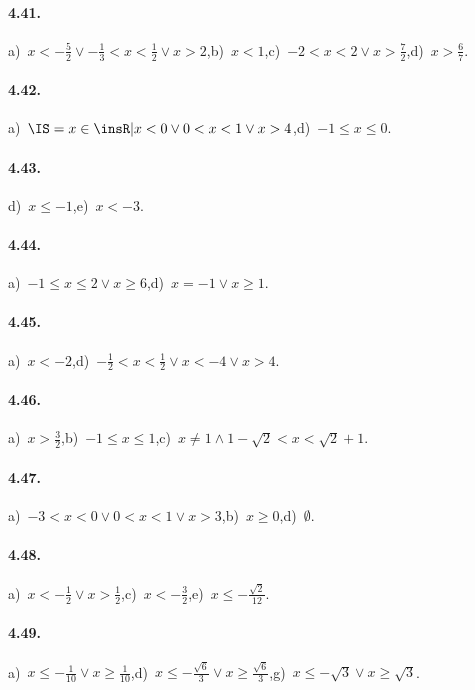 \paragraph{4.41.} a)~$x<-\frac 5 2\vee -\frac 1 3<x<\frac 1 2\vee x>2$,\quad b)~$x<1$,\quad c)~$-2<x<2\vee x>\frac 7 2$,\quad d)~$x>\frac{6}{7}$.

\paragraph{4.42.} a)~$\IS=x\in \insR| x<0\vee 0<x<1\vee x>4$,\quad d)~$-1\le x\le 0$.

\paragraph{4.43.} d)~$x\le -1$,\quad e)~$x<-3$.

\paragraph{4.44.} a)~$-1\le x\le 2\vee x\ge 6$,\quad d)~$x=-1\vee x\ge 1$.

\paragraph{4.45.} a)~$x<-2$,\quad d)~$-\frac{1}{2}<x<\frac{1}{2}\vee x<-4\vee x>4$.

\paragraph{4.46.} a)~$x>\frac 3 2$,\quad b)~$-1\le x\le 1$,\quad c)~$x\neq 1 \wedge 1-\sqrt{2}<x<\sqrt{2}+1$.

\paragraph{4.47.} a)~$-3<x<0\vee 0<x<1\vee x>3$,\quad b)~$x\ge 0$,\quad d)~$\emptyset$.

\paragraph{4.48.} a)~$x<-\frac{1}{2}\vee x>\frac{1}{2}$,\quad c)~$x<-\frac{3}{2}$,\quad e)~$x\le -\frac{\sqrt{2}}{12}$.

\paragraph{4.49.} a)~$x\le -\frac{1}{10}\vee x\ge \frac{1}{10}$,\quad d)~$x\le -\frac{\sqrt{6}}{3}\vee x\ge \frac{\sqrt{6}}{3}$,\quad g)~$x\le-\sqrt{3}\vee x\ge \sqrt{3}$.

